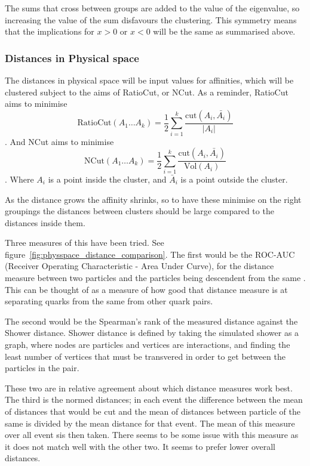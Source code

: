 The sums that cross between groups are added to the value of the eigenvalue,
so increasing the value of the sum disfavours the clustering.
This symmetry means that the implications for \(x > 0\) or \(x < 0\) will be the same as summarised above.

\subsubsection{Distances in Physical space}\label{sec:distance_in_physical}
The distances in physical space will be input values for affinities,
which will be clustered subject to the aims of RatioCut, or NCut.
As a reminder, RatioCut aims to minimise
        \begin{equation} \text{RatioCut}(A_1 \dots A_k) = \frac{1}{2} \sum_{i=1}^k \frac{\text{cut}(A_i, \bar{A_i})}{|A_i|}\end{equation}.
And NCut aims to minimise 
        \begin{equation} \text{NCut}(A_1 \dots A_k) = \frac{1}{2} \sum_{i=1}^k \frac{\text{cut}(A_i, \bar{A_i})}{\text{Vol}(A_i)}\end{equation}.
Where \(A_i\) is a point inside the cluster, and \(\bar{A}_i\) is a point outside the cluster.

As the distance grows the affinity shrinks, so to have these minimise on the right groupings
the distances between clusters should be large compared to the distances inside them.


Three measures of this have been tried. See figure~\ref{fig:physspace_distance_comparison}.
The first would be the ROC-AUC (Receiver Operating Characteristic - Area Under Curve),
for the distance measure between two particles and the particles being descendent from the same
.
This can be thought of as a measure of how good that distance measure is at separating 
quarks from the same  from other quark pairs.

The second would be the Spearman's rank of the measured distance against the Shower distance.
Shower distance is defined by taking the simulated shower as a graph, where nodes are particles
and vertices are interactions, and finding the least number of vertices that must be transvered 
in order to get between the particles in the pair.

These two are in relative agreement about which distance measures work best.
The third is the normed distances; in each event the difference between
the mean of distances that would be cut and the mean of distances between particle of the same
 is divided by the mean distance for that event.
The mean of this measure over all event sis then taken.
There seems to be some issue with this measure as it does not match well with the other two.
It seems to prefer lower overall distances.

